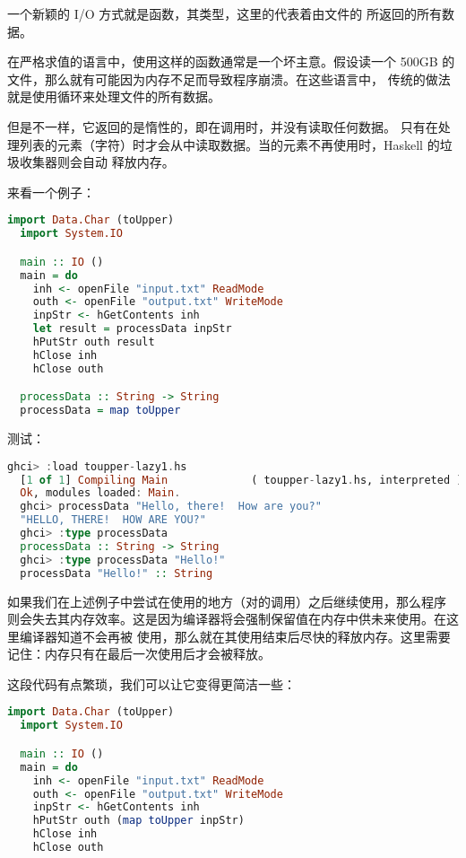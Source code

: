 \documentclass[./main.tex]{subfiles}
\begin{document}
一个新颖的 I/O 方式就是函数，其类型，这里的代表着由文件的
所返回的所有数据。

在严格求值的语言中，使用这样的函数通常是一个坏主意。假设读一个 500GB 的文件，那么就有可能因为内存不足而导致程序崩溃。在这些语言中，
传统的做法就是使用循环来处理文件的所有数据。

但是不一样，它返回的是惰性的，即在调用时，并没有读取任何数据。
只有在处理列表的元素（字符）时才会从中读取数据。当的元素不再使用时，Haskell 的垃圾收集器则会自动
释放内存。

来看一个例子：

\begin{lstlisting}[language=Haskell]
  import Data.Char (toUpper)
  import System.IO

  main :: IO ()
  main = do
    inh <- openFile "input.txt" ReadMode
    outh <- openFile "output.txt" WriteMode
    inpStr <- hGetContents inh
    let result = processData inpStr
    hPutStr outh result
    hClose inh
    hClose outh

  processData :: String -> String
  processData = map toUpper
\end{lstlisting}

测试：

\begin{lstlisting}[language=Haskell]
  ghci> :load toupper-lazy1.hs
  [1 of 1] Compiling Main             ( toupper-lazy1.hs, interpreted )
  Ok, modules loaded: Main.
  ghci> processData "Hello, there!  How are you?"
  "HELLO, THERE!  HOW ARE YOU?"
  ghci> :type processData
  processData :: String -> String
  ghci> :type processData "Hello!"
  processData "Hello!" :: String
\end{lstlisting}

\begin{awarn}
  如果我们在上述例子中尝试在使用的地方（对的调用）之后继续使用，那么程序
  则会失去其内存效率。这是因为编译器将会强制保留值在内存中供未来使用。在这里编译器知道不会再被
  使用，那么就在其使用结束后尽快的释放内存。这里需要记住：内存只有在最后一次使用后才会被释放。
\end{awarn}

这段代码有点繁琐，我们可以让它变得更简洁一些：

\begin{lstlisting}[language=Haskell]
  import Data.Char (toUpper)
  import System.IO

  main :: IO ()
  main = do
    inh <- openFile "input.txt" ReadMode
    outh <- openFile "output.txt" WriteMode
    inpStr <- hGetContents inh
    hPutStr outh (map toUpper inpStr)
    hClose inh
    hClose outh
\end{lstlisting}
\end{document}
